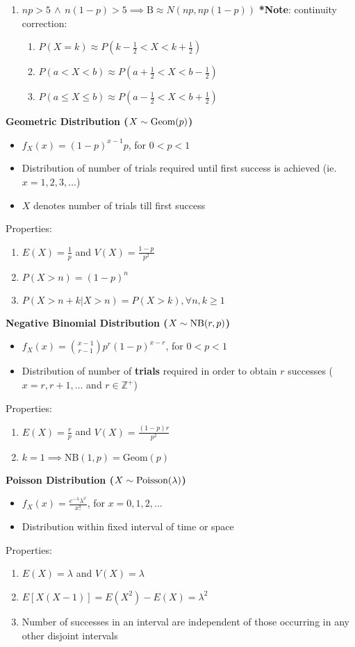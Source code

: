 \documentclass[a4paper, 12pt]{article}
\begin{document}
\begin{multicols*}{4}
\begin{enumerate}
    \item $np>5 \, \wedge \, n(1-p)>5 \implies \text{B} \approx N(np,np(1-p))$ \textbf{*Note}: continuity correction:
    \begin{enumerate}
        \item $P(X = k) \approx P(k-\frac{1}{2}<X<k+\frac{1}{2})$
        \item $P(a<X<b) \approx P(a+\frac{1}{2}<X<b-\frac{1}{2})$
        \item $P(a\leq X\leq b) \approx P(a-\frac{1}{2}<X<b+\frac{1}{2})$
    \end{enumerate}
\end{enumerate}
\textbf{Geometric Distribution ($X \sim \textnormal{Geom}(p)$)}
\begin{itemize}
    \item $f_X(x) = (1-p)^{x-1}p$, for $0<p<1$
    \item Distribution of number of trials required until first success is achieved (ie. $x = 1,2,3,\dots$)
    \item $X$ denotes number of trials till first success
\end{itemize}
Properties:
\begin{enumerate}
    \item $E(X) = \frac{1}{p}$ and $V(X) = \frac{1-p}{p^2}$
    \item $P(X > n) = (1-p)^n$
    \item $P(X>n+k|X>n) = P(X>k), \forall n,k \geq 1$
\end{enumerate}
\textbf{Negative Binomial Distribution ($X \sim \textnormal{NB}(r,p)$)}
\begin{itemize}
    \item $f_X(x) = \binom{x-1}{r-1}p^r(1-p)^{x-r}$, for $0<p<1$
    \item Distribution of number of \textbf{trials} required in order to obtain $r$ successes ($x=r,r+1,\dots$ and $r \in \mathbb{Z}^+$)
\end{itemize}
Properties:
\begin{enumerate}
    \item $E(X) = \frac{r}{p}$ and $V(X) = \frac{(1-p)r}{p^2}$
    \item $k=1 \implies \text{NB}(1,p) = \text{Geom}(p)$
\end{enumerate}
\textbf{Poisson Distribution ($X \sim \textnormal{Poisson}(\lambda)$)}
\begin{itemize}
    \item $f_X(x) = \frac{e^{-\lambda}\lambda^x}{x!}$, for $x=0,1,2,\dots$
    \item Distribution within fixed interval of time or space
\end{itemize}
Properties:
\begin{enumerate}
    \item $E(X) = \lambda$ and $V(X) = \lambda$
    \item $E[X(X-1)] = E(X^2)-E(X) = \lambda^2$
    \item Number of successes in an interval are independent of those occurring in any other disjoint intervals
\end{enumerate}


\end{multicols*}
\end{document}
